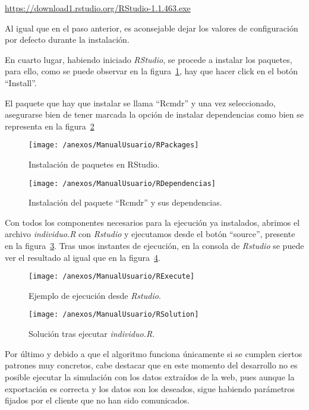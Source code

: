 \url{https://download1.rstudio.org/RStudio-1.1.463.exe}

Al igual que en el paso anterior, es aconsejable dejar los valores de configuración por defecto durante la instalación.

En cuarto lugar, habiendo iniciado \textit{RStudio}, se procede a instalar los paquetes, para ello, como se puede observar en la figura~\ref{img:RPackages}, hay que hacer click en el botón ``Install''.

El paquete que hay que instalar se llama ``Rcmdr'' y una vez seleccionado, asegurarse bien de tener marcada la opción de instalar dependencias como bien se representa en la figura~\ref{img:RDependencias}

\begin{figure}[h]
	\centering
	\texttt{[image: /anexos/ManualUsuario/RPackages]}
	\caption{Instalación de paquetes en RStudio.}	
	\label{img:RPackages}
\end{figure}

\begin{figure}[h]
	\centering
	\texttt{[image: /anexos/ManualUsuario/RDependencias]}
	\caption{Instalación del paquete ``Rcmdr'' y sus dependencias.}	
	\label{img:RDependencias}
\end{figure}

Con todos los componentes necesarios para la ejecución ya instalados, abrimos el archivo \textit{individuo.R} con \textit{Rstudio} y ejecutamos desde el botón ``source'', presente en la figura~\ref{img:RExecute}. Tras unos instantes de ejecución, en la consola de \textit{Rstudio} se puede ver el resultado al igual que en la figura~\ref{img:RSolution}.

\begin{figure}[h]
	\centering
	\texttt{[image: /anexos/ManualUsuario/RExecute]}
	\caption{Ejemplo de ejecución desde \textit{Rstudio}.}	
	\label{img:RExecute}
\end{figure}

\begin{figure}[h!]
	\centering
	\texttt{[image: /anexos/ManualUsuario/RSolution]}
	\caption{Solución tras ejecutar \textit{individuo.R}.}	
	\label{img:RSolution}
\end{figure}

Por último y debido a que el algoritmo funciona únicamente si se cumplen ciertos patrones muy concretos, cabe destacar que en este momento del desarrollo no es posible ejecutar la simulación con los datos extraídos de la web, pues aunque la exportación es correcta y los datos son los deseados, sigue habiendo parámetros fijados por el cliente que no han sido comunicados. 

